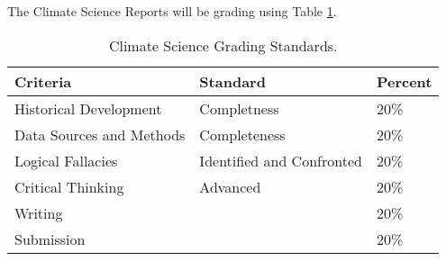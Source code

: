The Climate Science Reports will be grading using Table \ref{tab:climatesciencereportgrading}. 

\begin{table}[h]
\caption{Climate Science Grading Standards.}
\label{tab:climatesciencereportgrading}
\begin{tabular}{lll}\hline
Criteria                & Standard      & Percent \\
\hline\hline
Historical Development  & Completness   & 20\% \\
Data Sources and Methods  & Completeness  & 20\% \\
Logical Fallacies & Identified and Confronted   & 20\% \\
Critical Thinking & Advanced                    & 20\%\\
Writing           && 20\% \\
Submission        && 20\% \\
\hline
\end{tabular}
\end{table}

